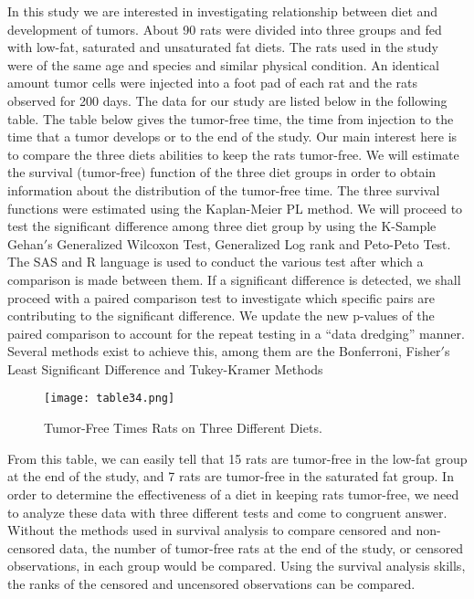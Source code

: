 \documentclass[11pt]{article}
\numberwithin{figure}{section}
\begin{document}


In this study we are interested in investigating relationship between diet and development of tumors. About 90 rats were divided into three groups and fed with low-fat, saturated and unsaturated fat diets. The rats used in the study were of the same age and species and similar physical condition. An identical amount tumor cells were injected into a foot pad of each rat and the rats observed for 200 days.
The data for our study are listed below in the following table. The table below gives the tumor-free time, the time from injection to the time that a tumor develops or to the end of the study.
Our main interest here is to compare the three diets abilities to keep the rats tumor-free. We will estimate the survival (tumor-free) function  of the three diet groups in order to obtain information about the distribution of the tumor-free time. The three survival functions were estimated using the Kaplan-Meier PL method.
We will proceed to test the significant difference among three diet group by using the K-Sample Gehan$'$s  Generalized Wilcoxon Test, Generalized Log rank and Peto-Peto Test. The SAS and R language is used to conduct the various test after which a comparison is made between them. If a significant difference is detected, we shall proceed with a paired comparison test to investigate which specific pairs are contributing to the significant difference. We update the new p-values of the paired comparison to account for the repeat testing in a $“$data dredging$”$ manner. Several methods exist to achieve this, among them are the Bonferroni, Fisher$'$s Least Significant Difference and Tukey-Kramer Methods

\begin{figure}[h!]
  \caption{Tumor-Free Times Rats on Three Different Diets.}
  \centering
    \texttt{[image: table34.png]}
\label{fig:awesome_image}
\end{figure}
\newpage
From this table, we can easily tell that 15 rats are tumor-free in the low-fat group at the end of the study, and 7 rats are tumor-free in the saturated fat group.  In order to determine the effectiveness of a diet in keeping rats tumor-free, we need to analyze these data with three different tests and come to congruent answer. Without the methods used in survival analysis to compare censored and non-censored data, the number of tumor-free rats at the end of the study, or censored observations, in each group would be compared.  Using the survival analysis skills, the ranks of the censored and uncensored observations can be compared. 
\end{document}
